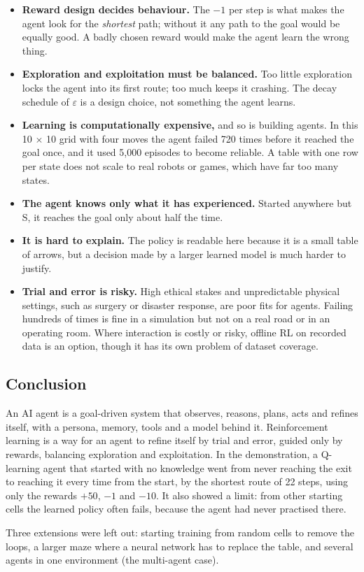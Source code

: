 \documentclass[11pt, a4paper]{article}
\begin{document}
\begin{itemize}
    \item \textbf{Reward design decides behaviour.} The $-1$ per step is what makes the agent look for the \emph{shortest} path; without it any path to the goal would be equally good. A badly chosen reward would make the agent learn the wrong thing.
    \item \textbf{Exploration and exploitation must be balanced.} Too little exploration locks the agent into its first route; too much keeps it crashing. The decay schedule of $\varepsilon$ is a design choice, not something the agent learns.
    \item \textbf{Learning is computationally expensive,} and so is building agents. In this 10 $\times$ 10 grid with four moves the agent failed 720 times before it reached the goal once, and it used 5,000 episodes to become reliable. A table with one row per state does not scale to real robots or games, which have far too many states.
    \item \textbf{The agent knows only what it has experienced.} Started anywhere but S, it reaches the goal only about half the time.
    \item \textbf{It is hard to explain.} The policy is readable here because it is a small table of arrows, but a decision made by a larger learned model is much harder to justify.
    \item \textbf{Trial and error is risky.} High ethical stakes and unpredictable physical settings, such as surgery or disaster response, are poor fits for agents. Failing hundreds of times is fine in a simulation but not on a real road or in an operating room. Where interaction is costly or risky, offline RL on recorded data is an option, though it has its own problem of dataset coverage.
\end{itemize}

\subsection{Conclusion}

An AI agent is a goal-driven system that observes, reasons, plans, acts and refines itself, with a persona, memory, tools and a model behind it. Reinforcement learning is a way for an agent to refine itself by trial and error, guided only by rewards, balancing exploration and exploitation. In the demonstration, a Q-learning agent that started with no knowledge went from never reaching the exit to reaching it every time from the start, by the shortest route of 22 steps, using only the rewards $+50$, $-1$ and $-10$. It also showed a limit: from other starting cells the learned policy often fails, because the agent had never practised there.

Three extensions were left out: starting training from random cells to remove the loops, a larger maze where a neural network has to replace the table, and several agents in one environment (the multi-agent case).

\end{document}

